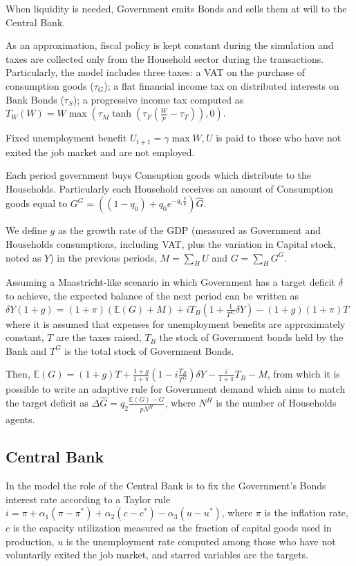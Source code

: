 \documentclass[a4paper, headings=standardclasses]{scrartcl}
\begin{document}
When liquidity is needed, Government emits Bonds and sells them at will to the Central Bank.

As an approximation, fiscal policy is kept constant during the simulation and taxes are collected only from the Household sector during the transactions. Particularly, the model includes three taxes: a VAT on the purchase of consumption goods ($\tau_G$); a flat financial income tax on distributed interests on Bank Bonds ($\tau_S$); a progressive income tax computed as $T_W(W) = W \max(\tau_M \tanh(\tau_F (\frac{W}{p} - \tau_T)),0)$.

Fixed unemployment benefit $U_{t+1} = \gamma \max{W, U}$ is paid to those who have not exited the job market and are not employed.

Each period government buys Consuption goods which distribute to the Households. Particularly each Household receives an amount of Consumption goods equal to $G^G = ((1 - q_0) + q_0 e^{-q_1\frac{V}{p}})\hat{G}$.

We define $g$ as the growth rate of the GDP (measured as Government and Households consumptions, including VAT, plus the variation in Capital stock, noted as $Y$) in the previous periods, $M = \sum_H U$ and $G = \sum_H G^G$.

Assuming a Maastricht-like scenario in which Government has a target deficit $\delta$ to achieve, the expected balance of the next period can be written as $\delta Y (1+g) = (1+\pi) (\mathbb{E}(G) + M) + i T_B(1 + \frac{1}{T^G} \delta Y) - (1+g)(1+\pi) T$ where it is assumed that expenses for unemployment benefits are approximately constant, $T$ are the taxes raised, $T_B$ the stock of Government bonds held by the Bank and $T^G$ is the total stock of Government Bonds.

Then, $\mathbb{E}(G) = (1+g) T + \frac{1+g}{1+\pi}(1-i\frac{T_B}{T^G})\delta Y - \frac{i}{1+\pi}T_B - M$, from which it is possible to write an adaptive rule for Government demand which aims to match the target deficit as $\Delta \hat{G} = q_2 \frac{\mathbb{E}(G)-G}{p N^H}$, where $N^H$ is the number of Households agents.


\subsection{Central Bank}
In the model the role of the Central Bank is to fix the Government's Bonds interest rate according to a Taylor rule $i = \pi + \alpha_1 (\pi - \pi^*) + \alpha_2 (c - c^*) - \alpha_3 (u - u^*)$, where $\pi$ is the inflation rate, $c$ is the capacity utilization measured as the fraction of capital goods used in production, $u$ is the unemployment rate computed among those who have not voluntarily exited the job market, and starred variables are the targets.
\end{document}
